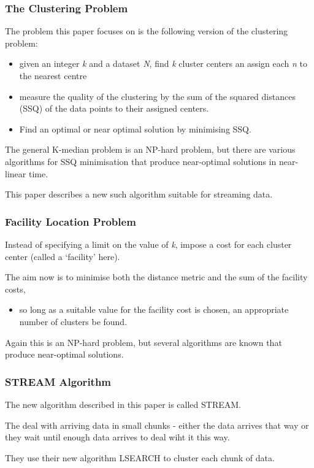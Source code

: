 \documentclass{beamer}
\begin{document}
\frame
{
  \frametitle{The Clustering Problem}

  The problem this paper focuses on is the following version of the
  clustering problem: 
  
  \begin{itemize}
  \item given an integer {\em k} and a dataset {\em N}, find {\em k}
    cluster centers an assign each {\em n} to the nearest centre
  \item measure the quality of the clustering by the sum of the
    squared distances (SSQ) of the data points to their assigned centers.
  \item Find an optimal or near optimal solution by minimising SSQ.
  \end{itemize}

  The general K-median problem is an NP-hard problem, but there are
  various algorithms for SSQ minimisation that produce near-optimal
  solutions in near-linear time.

  \bigskip
  This paper describes a new such algorithm suitable for streaming
  data.
  
}

\frame
{
  \frametitle{Facility Location Problem}

  Instead of specifying a limit on the value of {\em k}, impose
  a cost for each cluster center (called a `facility' here).

  \bigskip
  The aim now is to minimise both the distance metric and the
  sum of the facility costs,
  \begin{itemize}
  \item so long as a suitable value for the facility cost is
    chosen, an appropriate number of clusters be found.
  \end{itemize}
  \bigskip
  Again this is an NP-hard problem, but several algorithms are
  known that produce near-optimal solutions.

  
}


\frame
{
  \frametitle{STREAM Algorithm}

  The new algorithm described in this paper is called STREAM.

  The deal with arriving data in small chunks - either the data
  arrives that way or they wait until enough data arrives to deal wiht
  it this way.

  They use their new algorithm LSEARCH to cluster each chunk of data.

 

}
\end{document}
